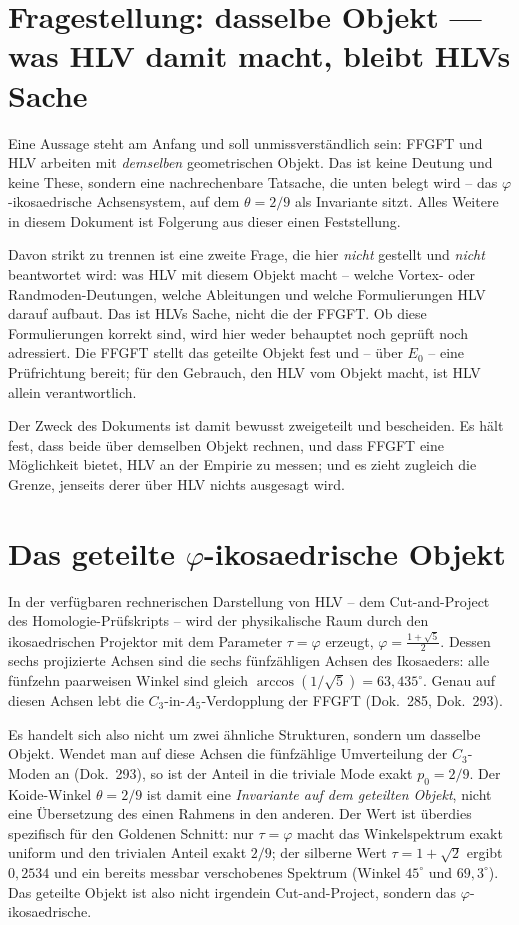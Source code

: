 \section{Fragestellung: dasselbe Objekt --- was HLV damit macht, bleibt HLVs Sache}
Eine Aussage steht am Anfang und soll unmissverständlich sein: FFGFT und HLV arbeiten mit
\emph{demselben} geometrischen Objekt. Das ist keine Deutung und keine These, sondern eine
nachrechenbare Tatsache, die unten belegt wird -- das $\varphi$-ikosaedrische Achsensystem, auf
dem $\theta=2/9$ als Invariante sitzt. Alles Weitere in diesem Dokument ist Folgerung aus dieser
einen Feststellung.

Davon strikt zu trennen ist eine zweite Frage, die hier \emph{nicht} gestellt und \emph{nicht}
beantwortet wird: was HLV mit diesem Objekt macht -- welche Vortex- oder Randmoden-Deutungen,
welche Ableitungen und welche Formulierungen HLV darauf aufbaut. Das ist HLVs Sache, nicht die
der FFGFT. Ob diese Formulierungen korrekt sind, wird hier weder behauptet noch geprüft noch
adressiert. Die FFGFT stellt das geteilte Objekt fest und -- über $E_0$ -- eine Prüfrichtung
bereit; für den Gebrauch, den HLV vom Objekt macht, ist HLV allein verantwortlich.

Der Zweck des Dokuments ist damit bewusst zweigeteilt und bescheiden. Es hält fest, dass beide
über demselben Objekt rechnen, und dass FFGFT eine Möglichkeit bietet, HLV an der Empirie zu
messen; und es zieht zugleich die Grenze, jenseits derer über HLV nichts ausgesagt wird.

\section{Das geteilte $\varphi$-ikosaedrische Objekt}
In der verfügbaren rechnerischen Darstellung von HLV -- dem Cut-and-Project des
Homologie-Prüfskripts  -- wird der physikalische
Raum durch den ikosaedrischen Projektor mit dem Parameter $\tau=\varphi$ erzeugt,
$\varphi=\tfrac{1+\sqrt5}{2}$. Dessen sechs projizierte Achsen sind die sechs fünfzähligen
Achsen des Ikosaeders: alle fünfzehn paarweisen Winkel sind gleich $\arccos(1/\sqrt5)=
63{,}435^\circ$. Genau auf diesen Achsen lebt die $C_3$-in-$A_5$-Verdopplung der FFGFT
(Dok.~285, Dok.~293).

Es handelt sich also nicht um zwei ähnliche Strukturen, sondern um dasselbe Objekt. Wendet man
auf diese Achsen die fünfzählige Umverteilung der $C_3$-Moden an (Dok.~293), so ist der Anteil
in die triviale Mode exakt $p_0=2/9$. Der Koide-Winkel $\theta=2/9$ ist damit eine
\emph{Invariante auf dem geteilten Objekt}, nicht eine Übersetzung des einen Rahmens in den
anderen. Der Wert ist überdies spezifisch für den Goldenen Schnitt: nur $\tau=\varphi$ macht
das Winkelspektrum exakt uniform und den trivialen Anteil exakt $2/9$; der silberne Wert
$\tau=1+\sqrt2$ ergibt $0{,}2534$ und ein bereits messbar verschobenes Spektrum (Winkel
$45^\circ$ und $69{,}3^\circ$). Das geteilte
Objekt ist also nicht irgendein Cut-and-Project, sondern das $\varphi$-ikosaedrische.

